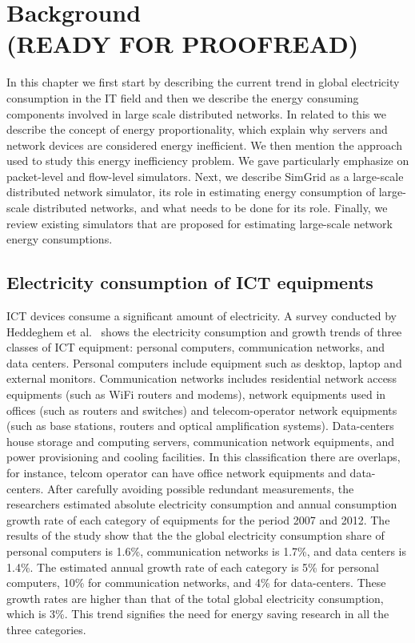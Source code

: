 \chapter{Background\\(READY FOR PROOFREAD)}
\label{chapter:background} 
In this chapter we first start by describing the current trend in global electricity consumption in the IT field and then we describe the energy consuming components involved in large scale distributed networks. In related to this we describe the concept of energy proportionality, which explain why servers and network devices are considered energy inefficient. We then mention the approach used to study this energy inefficiency problem. We gave particularly emphasize on packet-level and flow-level simulators. Next, we describe SimGrid as a large-scale distributed network simulator, its role in estimating energy consumption of large-scale distributed networks, and what needs to be done for its role. Finally, we review existing simulators that are proposed for estimating large-scale network energy consumptions.
\section{Electricity consumption of ICT equipments}
\label{section:ictequipment} 
ICT devices consume a significant amount of electricity. A survey conducted by Heddeghem et al.{\ }\cite{DBLP:journals/comcom/HeddeghemLLCPD14} shows the electricity consumption and growth trends of three classes of ICT equipment: personal computers, communication networks, and data centers. Personal computers include equipment such as desktop, laptop and external monitors. Communication networks includes residential network access equipments (such as WiFi routers and modems), network equipments used in offices (such as routers and switches) and telecom-operator network equipments (such as base stations, routers and optical amplification systems). Data-centers house storage and computing servers, communication network equipments, and power provisioning and cooling facilities.  In this classification there are overlaps, for instance, telcom operator can have office network equipments and data-centers. After carefully avoiding possible redundant measurements, the researchers estimated absolute electricity consumption and annual consumption growth rate of each category of equipments for the period 2007 and 2012. The results of the study show that the  the global electricity consumption share of personal computers is 1.6\%, communication networks is 1.7\%, and data centers is 1.4\%. The estimated annual growth rate of each category is 5\% for personal computers, 10\% for communication networks, and 4\% for data-centers. These growth rates are higher than that of the total global electricity consumption, which is 3\%. This trend signifies the need for energy saving research in all the three categories.


